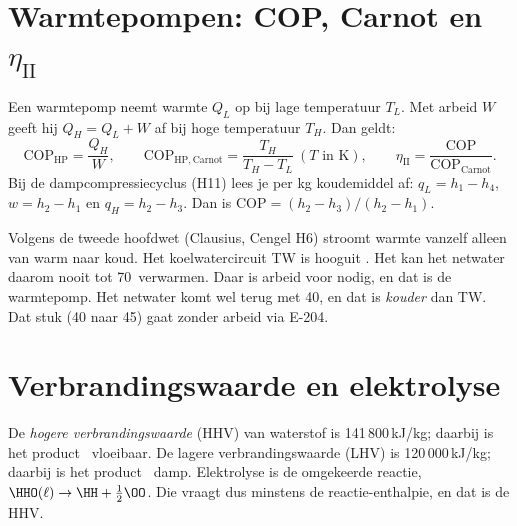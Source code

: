 \section{Warmtepompen: COP, Carnot en $\eta_\mathrm{II}$}
\begin{methode}[– Cengel H6, H8 en H11]
Een warmtepomp neemt warmte $Q_L$ op bij lage temperatuur $T_L$. Met arbeid $W$ geeft hij $Q_H = Q_L + W$ af
bij hoge temperatuur $T_H$. Dan geldt:
\[
\mathrm{COP}_\mathrm{HP} = \frac{Q_H}{W},\qquad
\mathrm{COP}_\mathrm{HP,Carnot} = \frac{T_H}{T_H-T_L}\ (T\text{ in K}),\qquad
\eta_\mathrm{II} = \frac{\mathrm{COP}}{\mathrm{COP}_\mathrm{Carnot}}.
\]
Bij de dampcompressiecyclus (H11) lees je per kg koudemiddel af:
$q_L = h_1-h_4$, $w = h_2-h_1$ en $q_H = h_2-h_3$. Dan is $\mathrm{COP} = (h_2-h_3)/(h_2-h_1)$.
\end{methode}
\begin{waarom}
Volgens de tweede hoofdwet (Clausius, Cengel H6) stroomt warmte vanzelf alleen van warm naar koud. Het
koelwatercircuit TW is hooguit \degC. Het kan het netwater daarom nooit tot 70\degC\ verwarmen.
Daar is arbeid voor nodig, en dat is de warmtepomp. Het netwater komt wel terug met 40\degC, en dat is
\emph{kouder} dan TW. Dat stuk (40 naar 45\degC) gaat zonder arbeid via E-204.
\end{waarom}

\section{Verbrandingswaarde en elektrolyse}
\begin{methode}
De \emph{hogere verbrandingswaarde} (HHV) van waterstof is 141\,800\,kJ/kg; daarbij is het product
\HHO\ vloeibaar. De lagere verbrandingswaarde (LHV) is 120\,000\,kJ/kg; daarbij is het product \HHO\ damp.
Elektrolyse is de omgekeerde reactie, $\HHO(\ell) \rightarrow \HH + \tfrac12\OO$. Die vraagt dus minstens de
reactie-enthalpie, en dat is de HHV.
\end{methode}

